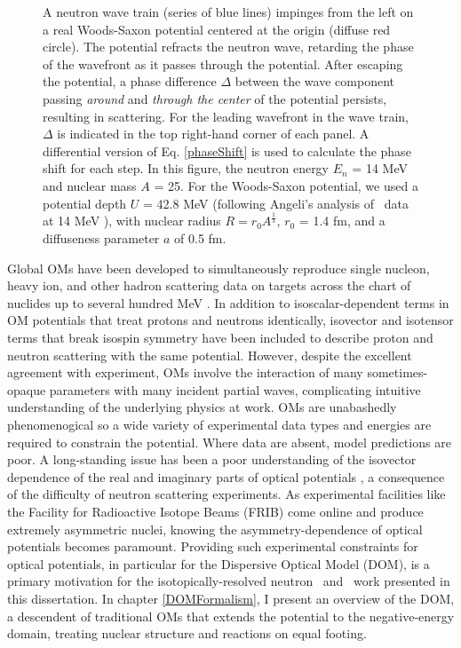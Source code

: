 \begin{figure}
    \caption[A illustration of the nuclear Ramsauer effect]{
        A neutron wave train (series of
        blue lines) impinges from the left on a real Woods-Saxon
        potential centered at the origin (diffuse red circle). The potential
        refracts the neutron wave,
        retarding the phase of the wavefront as it passes through the
        potential. After escaping the potential, a phase difference $\Delta$ between
        the wave component passing \textit{around} and \textit{through the center}
        of the potential persists, resulting in scattering.
        For the leading wavefront in the wave train, $\Delta$ is indicated in
        the top right-hand corner of each panel. A differential version of
        Eq. \ref{phaseShift} is used to
        calculate the phase shift for each step. In this figure, the neutron
        energy $E_{n}$ = 14 MeV and nuclear mass $A$ = 25. For the Woods-Saxon potential,
        we used a potential depth $U$ = 42.8 MeV (following Angeli's analysis
        of \tot\ data at 14 MeV \cite{Angeli1970}), with nuclear radius $R = 
        r_{0}A^{\frac{1}{3}}$, $r_{0}$ = 1.4 fm, and a diffuseness parameter
        $a$ of 0.5 fm.
    }
    \label{RamsauerPhaseShiftFigure}
\end{figure}

Global OMs have been developed to simultaneously reproduce single nucleon, heavy ion,
and other hadron scattering data on targets across the chart of nuclides up to several
hundred MeV \cite{CH89, KoningDelaroche}. In addition to isoscalar-dependent terms
in OM potentials that treat protons
and neutrons identically, isovector and isotensor terms that break isospin
symmetry have been included to describe proton and neutron scattering with the
same potential. However, despite the excellent agreement with experiment, OMs 
involve the interaction of many sometimes-opaque parameters with many incident
partial waves, complicating intuitive understanding of the underlying physics at work.
OMs are unabashedly phenomenogical so a wide variety of
experimental data types and energies are required to constrain the potential.
Where data are absent, model predictions are poor. A long-standing issue has
been a poor understanding of the isovector dependence of the real and
imaginary parts of optical potentials \cite{Holt16}, a consequence of the
difficulty of neutron scattering experiments. As experimental facilities like
the Facility for Radioactive Isotope Beams (FRIB) come online and produce
extremely asymmetric nuclei, knowing the asymmetry-dependence of optical
potentials becomes paramount. Providing such experimental constraints for optical
potentials, in particular for the Dispersive Optical Model (DOM), is a primary 
motivation for the isotopically-resolved neutron \tot\ and \el\ work presented in this 
dissertation. In chapter \ref{DOMFormalism}, I present an overview of the DOM, a descendent of 
traditional OMs that extends the potential to the negative-energy domain, treating
nuclear structure and reactions on equal footing. 

